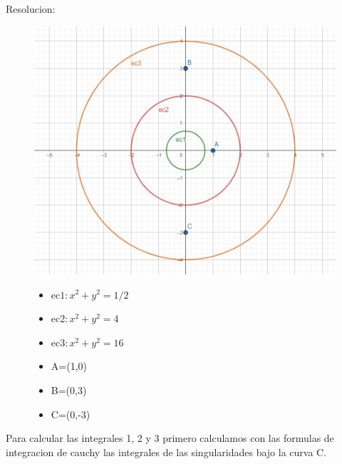\documentclass[12pt]{report}
\begin{document}
Resolucion:
\begin{figure}[h]
    \centering
    \begin{minipage}{0.65\textwidth}
        \centering
        \includegraphics[width=\textwidth]{./Imagenes/foto1Ej5.jpeg}
    \end{minipage}\hfill
    \begin{minipage}{0.35\textwidth}
        \centering
        \begin{itemize}
            \item $\text{ec1}:x^2+y^2=1/2$
            \item $\text{ec2}:x^2+y^2=4$
            \item $\text{ec3}:x^2+y^2=16$
            \item A=(1,0)
            \item B=(0,3)
            \item C=(0,-3)
        \end{itemize}
    \end{minipage}
\end{figure}

\vspace{1cm}
       
Para calcular las integrales 1, 2 y 3 primero calculamos con las formulas de integracion de cauchy las integrales de las singularidades bajo la curva C. \\
\end{document}
